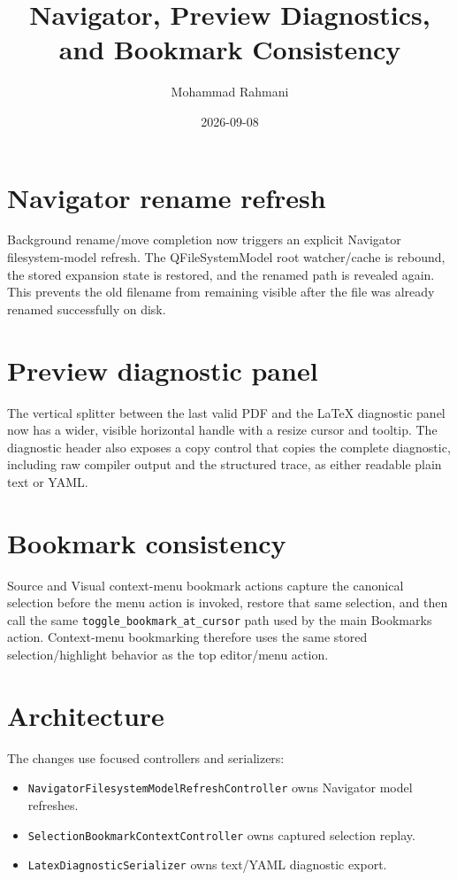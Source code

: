 \documentclass[a4paper]{article}
\title{Navigator, Preview Diagnostics, and Bookmark Consistency}
\date{2026-09-08}
\author{Mohammad Rahmani}
\begin{document}
   \maketitle

   \section{Navigator rename refresh}

   Background rename/move completion now triggers an explicit Navigator
   filesystem-model refresh. The QFileSystemModel root watcher/cache is rebound,
   the stored expansion state is restored, and the renamed path is revealed
   again. This prevents the old filename from remaining visible after the file
   was already renamed successfully on disk.

   \section{Preview diagnostic panel}

   The vertical splitter between the last valid PDF and the LaTeX diagnostic
   panel now has a wider, visible horizontal handle with a resize cursor and
   tooltip. The diagnostic header also exposes a copy control that copies the
   complete diagnostic, including raw compiler output and the structured trace,
   as either readable plain text or YAML.

   \section{Bookmark consistency}

   Source and Visual context-menu bookmark actions capture the canonical
   selection before the menu action is invoked, restore that same selection,
   and then call the same \verb|toggle_bookmark_at_cursor| path used by the main
   Bookmarks action. Context-menu bookmarking therefore uses the same stored
   selection/highlight behavior as the top editor/menu action.

   \section{Architecture}

   The changes use focused controllers and serializers:
   \begin{itemize}
      \item \verb|NavigatorFilesystemModelRefreshController| owns Navigator model refreshes.
      \item \verb|SelectionBookmarkContextController| owns captured selection replay.
      \item \verb|LatexDiagnosticSerializer| owns text/YAML diagnostic export.
   \end{itemize}

   
   
\end{document}
